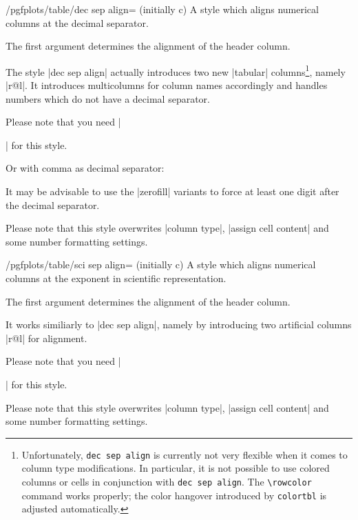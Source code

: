 \begin{stylekey}{/pgfplots/table/dec sep align= (initially c)}
	A style which aligns numerical columns at the decimal separator.

	The first argument determines the alignment of the header column. 

	The style |dec sep align| actually introduces two new |tabular| columns\footnote{Unfortunately, \texttt{dec sep align} is currently not very flexible when it comes to column type modifications. In particular, it is not possible to use colored columns or cells in conjunction with \texttt{dec sep align}. The \texttt{\textbackslash rowcolor} command works properly; the color hangover introduced by \texttt{colortbl} is adjusted automatically.}, namely |r@{}l|. It introduces multicolumns for column names accordingly and handles numbers which do not have a decimal separator. 
	
	Please note that you need |\usepackage{array}| for this style.
\begin{codeexample}[]
\end{codeexample}

	Or with comma as decimal separator:
\begin{codeexample}[]
\end{codeexample}
	It may be advisable to use the |zerofill| variants to force at least one digit after the decimal separator.

	Please note that this style overwrites |column type|, |assign cell content| and some number formatting settings.
\end{stylekey}

\begin{stylekey}{/pgfplots/table/sci sep align= (initially c)}
	A style which aligns numerical columns at the exponent in scientific representation.

	The first argument determines the alignment of the header column. 

	It works similiarly to |dec sep align|, namely by introducing two artificial columns |r@{}l| for alignment.
	
	Please note that you need |\usepackage{array}| for this style.

	Please note that this style overwrites |column type|, |assign cell content| and some number formatting settings.
\end{stylekey}

